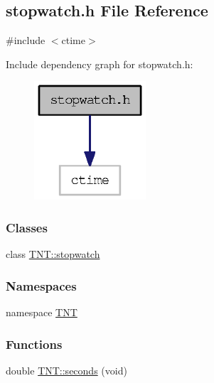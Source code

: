 \subsection{stopwatch.h File Reference}
\label{stopwatch_8h}
{\ttfamily \#include $<$ctime$>$}\par
Include dependency graph for stopwatch.h:
\nopagebreak
\begin{figure}[H]
\begin{center}
\leavevmode
\includegraphics[width=118pt]{stopwatch_8h__incl}
\end{center}
\end{figure}
\subsubsection*{Classes}
\begin{DoxyCompactItemize}
\item 
class \hyperlink{class_t_n_t_1_1stopwatch}{TNT::stopwatch}
\end{DoxyCompactItemize}
\subsubsection*{Namespaces}
\begin{DoxyCompactItemize}
\item 
namespace \hyperlink{namespace_t_n_t}{TNT}
\end{DoxyCompactItemize}
\subsubsection*{Functions}
\begin{DoxyCompactItemize}
\item 
double \hyperlink{namespace_t_n_t_acda64125650ad55545ea06319a71ffec}{TNT::seconds} (void)
\end{DoxyCompactItemize}

